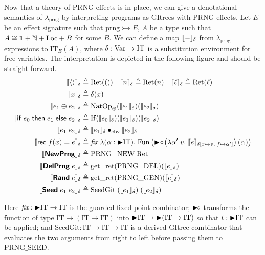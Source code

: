 \documentclass{article}
\theoremstyle{definition}
\theoremstyle{plain}
\theoremstyle{remark}
\newcommand{\prng}{\mathrm{prng}}
\newcommand{\subeff}{\rightarrowtail}
\newcommand{\IT}{\mathrm{IT}}
\newcommand{\gRet}{\mathrm{Ret}}
\newcommand{\gFun}{\mathrm{Fun}}
\newcommand{\getret}{\mathrm{get\_ret}}
\newcommand{\cbvap}{\bullet_{\text{cbv}}}
\newcommand{\gnatop}[1]{\mathrm{NatOp}_{#1}}
\newcommand{\gif}{\mathrm{If}}
\newcommand{\recval}[3]{\syn{rec}\;#1(#2)=#3}
\begin{document}
Now that a theory of PRNG effects is in place, we can give a denotational semantics of \(\lambda_\prng\) by interpreting programs as GItrees with PRNG effects.
Let \(E\) be an effect signature such that \(\prng\subeff E\), \(A\) be a type such that \(A \cong \mathbf{1} + \mathbb{N} + \mathrm{Loc} + B\) for some \(B\).
We can define a map \(\llbracket {-} \rrbracket_\delta\) from \(\lambda_\prng\) expressions to \(\IT_{E}(A)\), where
\(\senv:\iVar \to \IT\) is a substitution environment for free variables.
The interpretation is depicted in the following figure and should be straight-forward.
\[
  \begin{aligned}
    \sem{\vunit}_\senv &\eqdef \gRet(())
    \quad \sem{n}_\senv \eqdef \gRet(n)
    \quad \sem{\loc}_\senv \eqdef \gRet(\loc) \\
    \sem{x}_\senv &\eqdef \senv(x) \\
    \sem{e_1 \oplus e_2}_\senv &\eqdef \gnatop{\oplus}(\sem{e_1}_\senv)(\sem{e_2}_\senv) \\
    \sem{\syn{if}\;e_0\;\syn{then}\;e_1\;\syn{else}\;e_2}_\senv & \eqdef \gif(\sem{e_0}_\senv)(\sem{e_1}_\senv)(\sem{e_2}_\senv) \\
    \sem{\eapp{e_1}{e_2}}_\senv &\eqdef \sem{e_1}_\senv \cbvap \sem{e_2}_\senv \\
    \sem{\recval{f}{x}{\expr}}_\senv
                  &\eqdef \fix\;\lambda (\alpha : \latert \IT).\; 
                  \gFun\left(\latert\!\circ\!\left(\lambda \alpha'\;v.\;
                  \sem{\expr}_{\senv[x\mapsto v,\;f\mapsto \alpha']}\right)(\alpha)\right) \\
    \sem{\kw{NewPrng}}_\senv &\eqdef \mathrm{PRNG\_NEW}\;\gRet \\
    \sem{\kw{DelPrng}\;e}_\senv &\eqdef \getret(\mathrm{PRNG\_DEL})(\sem{e}_\senv) \\
    \sem{\kw{Rand}\;e}_\senv &\eqdef \getret(\mathrm{PRNG\_GEN})(\sem{e}_\senv) \\
    \sem{\kw{Seed}\;e_1\;e_2}_\senv &\eqdef \mathrm{SeedGit}\;(\sem{e_1}_\senv)\;(\sem{e_2}_\senv)
  \end{aligned}
\]

Here \(\fix : \latert \IT \to \IT\) is the guarded fixed point combinator;
\(\mathord{\blacktriangleright}\!\circ\) transforms the function of type \(\IT \to (\IT \to \IT)\) into \(\latert \IT \to \latert (\IT \to \IT)\) so that \(t : \latert \IT\) can be applied;
and \(\mathrm{SeedGit} : \IT \to \IT \to \IT\) is a derived GItree combinator that evaluates the two arguments from right to left before passing them to \(\mathrm{PRNG\_SEED}\).
\end{document}
